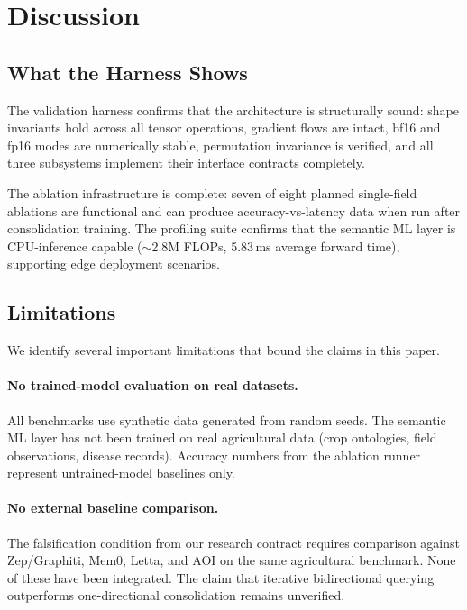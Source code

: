 \documentclass{article}
\begin{document}
\section{Discussion}
\label{sec:discussion}

\subsection{What the Harness Shows}

The validation harness confirms that the architecture is structurally sound:
shape invariants hold across all tensor operations, gradient flows are intact,
bf16 and fp16 modes are numerically stable, permutation invariance is verified,
and all three subsystems implement their interface contracts completely.

The ablation infrastructure is complete: seven of eight planned single-field
ablations are functional and can produce accuracy-vs-latency data when run after
consolidation training. The profiling suite confirms that the semantic ML layer
is CPU-inference capable ($\sim$2.8M FLOPs, 5.83\,ms average forward time),
supporting edge deployment scenarios.

\subsection{Limitations}
\label{sec:limitations}

We identify several important limitations that bound the claims in this paper.

\paragraph{No trained-model evaluation on real datasets.}
All benchmarks use synthetic data generated from random seeds. The semantic ML
layer has not been trained on real agricultural data (crop ontologies, field
observations, disease records). Accuracy numbers from the ablation runner
represent untrained-model baselines only.

\paragraph{No external baseline comparison.}
The falsification condition from our research contract requires comparison against
Zep/Graphiti, Mem0, Letta, and AOI on the same agricultural benchmark. None of
these have been integrated. The claim that iterative bidirectional querying
outperforms one-directional consolidation remains unverified.
\end{document}
